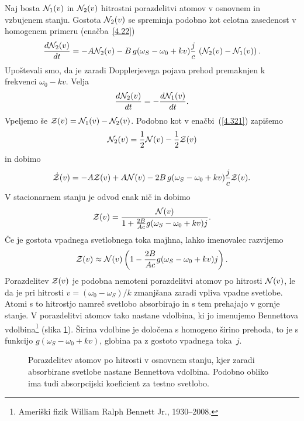Naj bosta ${\cal N}_{1}(v)$ in ${\cal N}_{2}(v)$ hitrostni porazdelitvi
atomov v osnovnem in vzbujenem stanju. Gostota
${\cal N}_{2}(v)$ se spreminja podobno kot celotna
zasedenost v homogenem primeru (enačba~\ref{4.22})
\begin{equation}
\frac{d{\cal N}_{2}(v)}{dt}=-A{\cal N}_{2}(v) -B\, g(\omega_S-\omega_{0}+kv)
\frac{j}{c}\,
\left({\cal N}_{2}(v)-{\cal N}_{1}(v)\right).
\label{4.85}
\end{equation}
Upoštevali smo, da je zaradi Dopplerjevega pojava prehod premaknjen k frekvenci
$\omega_{0}-kv$. Velja
\begin{equation}
 \frac{d{\cal N}_{2}(v)}{dt}=-\frac{d{\cal N}_{1}(v)}{dt}.
\label{4.86}
\end{equation}
Vpeljemo še ${\cal Z}(v)={\cal N}_{1}(v)-{\cal N}_{2}(v)$. Podobno kot 
v enačbi~(\ref{4.321}) zapišemo
\begin{equation}
{\cal N}_{2}(v)=\frac{1}{2}{\cal N}(v)-\frac{1}{2}{\cal Z}(v)
\end{equation}
in dobimo 
\begin{equation}
\dot{{\cal Z}}(v)=-A{\cal Z}(v)+A{\cal N}(v)
-2B\,g(\omega_S-\omega_{0}+kv)\frac{j}{c}
{\cal Z}(v).
\label{4.87}
\end{equation}
V stacionarnem stanju je odvod enak nič in dobimo
\begin{equation}
{\cal Z}(v)=\frac{{\cal N}(v)}{1+\frac{2B}{Ac}g(\omega_S-\omega_{0}+kv)j}.
\label{4.88}
\end{equation}
 Če je gostota vpadnega svetlobnega toka majhna, lahko imenovalec razvijemo
\begin{equation}
{\cal Z}(v)\approx{\cal N}(v)\left(1-\frac{2B}{Ac}g(\omega_S-\omega_{0}+kv)j\right).
\label{4.89}
\end{equation}
Porazdelitev ${\cal Z}(v)$ je podobna nemoteni porazdelitvi atomov
po hitrosti ${\cal N}(v)$, le da je pri hitrosti $v=(\omega_{0}-\omega_S)/k$
zmanjšana zaradi vpliva vpadne svetlobe. Atomi s to hitrostjo namreč svetlobo
absorbirajo in s tem prehajajo v gornje stanje. V porazdelitvi
atomov tako nastane vdolbina, ki jo imenujemo
Bennettova vdolbina\footnote{Ameriški fizik William Ralph Bennett Jr., 1930--2008.} 
(slika \ref{fig:Bennet}). Širina vdolbine je določena
s homogeno širino prehoda, to je s funkcijo $g(\omega_S-\omega_{0}+kv)$,
globina pa z gostoto vpadnega toka~$j$.
\begin{figure}[h]
\centering
\def\svgwidth{90truemm} 

\caption{Porazdelitev atomov po hitrosti v osnovnem stanju, kjer zaradi
absorbirane svetlobe nastane Bennettova vdolbina. Podobno obliko ima 
tudi absorpcijski koeficient za testno svetlobo.}
\label{fig:Bennet}
\end{figure}

